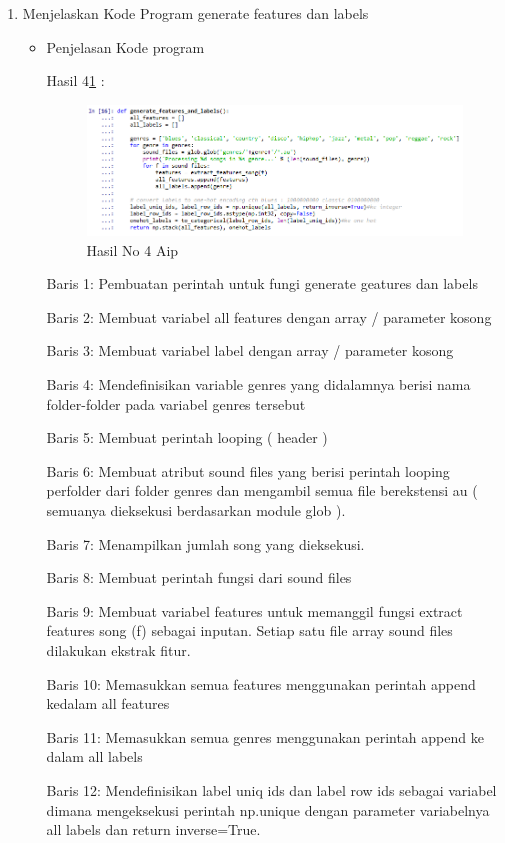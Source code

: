 \begin{enumerate}
\item Menjelaskan Kode Program generate features dan labels 
\begin{itemize}
\item Penjelasan Kode program

\par Hasil 4\ref{hasil4} :
\begin{figure}[ht]
\centering
\includegraphics[scale=0.7]{figures/AIP/no4aip.PNG}
\caption{Hasil No 4 Aip}
\label{hasil4}
\end{figure}
\par Baris 1: Pembuatan perintah untuk fungi generate geatures dan labels
\par Baris 2: Membuat variabel all features dengan array / parameter kosong
\par Baris 3: Membuat variabel label dengan array / parameter kosong
\par Baris 4: Mendefinisikan variable genres yang didalamnya berisi nama folder-folder pada variabel genres tersebut
\par Baris 5: Membuat perintah looping ( header )
\par Baris 6: Membuat atribut sound files yang berisi perintah looping perfolder dari folder genres dan mengambil semua file berekstensi au ( semuanya dieksekusi berdasarkan module glob ).
\par Baris 7: Menampilkan jumlah song yang dieksekusi.
\par Baris 8: Membuat perintah fungsi dari sound files
\par Baris 9: Membuat variabel features untuk memanggil fungsi extract features song (f) sebagai inputan. Setiap satu file array sound files dilakukan ekstrak fitur.
\par Baris 10: Memasukkan semua features menggunakan perintah append kedalam all features
\par Baris 11: Memasukkan semua genres menggunakan perintah append ke dalam all labels
\par Baris 12: Mendefinisikan label uniq ids dan label row ids sebagai variabel dimana mengeksekusi perintah np.unique dengan parameter variabelnya all labels dan return inverse=True.

\end{itemize}
\end{enumerate}
